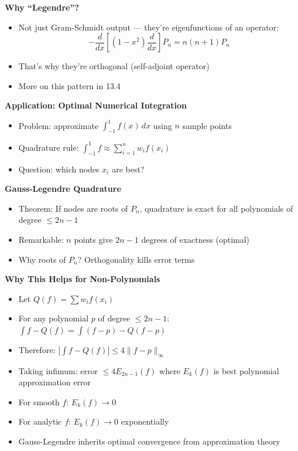 \documentclass[
  10pt,
  letterpaper,
]{scrbook}
\providecommand{\tightlist}{%
  \setlength{\itemsep}{0pt}\setlength{\parskip}{0pt}}
\begin{document}
\textbf{Why ``Legendre''?}

\begin{itemize}
\tightlist
\item
  Not just Gram-Schmidt output --- they're eigenfunctions of an
  operator:
  \[-\frac{d}{dx}\left[(1-x^2)\frac{d}{dx}\right] P_n = n(n+1) P_n\]
\item
  That's why they're orthogonal (self-adjoint operator)
\item
  More on this pattern in 13.4
\end{itemize}

\textbf{Application: Optimal Numerical Integration}

\begin{itemize}
\tightlist
\item
  Problem: approximate \(\int_{-1}^1 f(x)\, dx\) using \(n\) sample
  points
\item
  Quadrature rule: \(\int_{-1}^1 f \approx \sum_{i=1}^n w_i f(x_i)\)
\item
  Question: which nodes \(x_i\) are best?
\end{itemize}

\textbf{Gauss-Legendre Quadrature}

\begin{itemize}
\tightlist
\item
  Theorem: If nodes are roots of \(P_n\), quadrature is exact for all
  polynomials of degree \(\leq 2n-1\)
\item
  Remarkable: \(n\) points give \(2n-1\) degrees of exactness (optimal)
\item
  Why roots of \(P_n\)? Orthogonality kills error terms
\end{itemize}

\textbf{Why This Helps for Non-Polynomials}

\begin{itemize}
\tightlist
\item
  Let \(Q(f) = \sum w_i f(x_i)\)
\item
  For any polynomial \(p\) of degree \(\leq 2n-1\):
  \(\int f - Q(f) = \int(f-p) - Q(f-p)\)
\item
  Therefore: \(\left|\int f - Q(f)\right| \leq 4\|f - p\|_\infty\)
\item
  Taking infimum: error \(\leq 4 E_{2n-1}(f)\) where \(E_k(f)\) is best
  polynomial approximation error
\item
  For smooth \(f\): \(E_k(f) \to 0\)
\item
  For analytic \(f\): \(E_k(f) \to 0\) exponentially
\item
  Gauss-Legendre inherits optimal convergence from approximation theory
\end{itemize}
\end{document}
